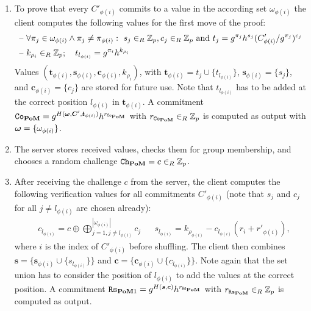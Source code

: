 \begin{enumerate}
  \item %
    To prove that every $C'_{\phi(i)}$ commits to a value in the according set $\omega_{\phi(i)}$ the client computes the following values for the first move of the proof:
    \begin{align*}
    \text{--}~ & \forall \pi_j\in\omega_{\phi(i)} \wedge \pi_j\not=\pi_{\phi(i)} :~ s_j\in_R\mathbb{Z}_p, c_j\in_R\mathbb{Z}_p \text{ and } t_j=g^{\pi_j}h^{s_j}(C'_{\phi(i)}/g^{\pi_j})^{c_j} \\      
    \text{--}~ & k_{\rho_i}\in_R\mathbb{Z}_p;\quad t_{l_{\phi(i)}}=g^{\pi_i}h^{k_{\rho_i}}
    \end{align*}
    Values $(\bm t_{\phi(i)}, \bm s_{\phi(i)}, \bm c_{\phi(i)}, k_{\rho_i})$, with $\bm t_{\phi(i)}=t_j \cup \{t_{l_{\phi(i)}}\}$, $\bm s_{\phi(i)}=\{s_j\}$, and $\bm c_{\phi(i)}=\{c_j\}$ are stored for future use.
    Note that $t_{l_{\phi(i)}}$ has to be added at the correct position $l_{\phi(i)}$ in $\bm t_{\phi(i)}$.
    A commitment $\mathtt{Co}_{\mathsf{\bf PoM}}=g^{H(\boldsymbol{\mathbf{\omega}}, \bm C', \bm t_{\phi(i)})} h^{r_{\mathtt{Co}_\mathsf{\bf PoM}}}$ with $r_{\mathtt{Co}_\mathsf{\bf PoM}}\in_R\mathbb{Z}_p$ is computed as output with $\boldsymbol{\mathbf{\omega}}=\{\omega_{\phi(i)}\}$.

  \item %
    The server stores received values, checks them for group membership, and chooses a random challenge $\mathtt{Ch}_\mathsf{\bf PoM}=c\in_R\mathbb{Z}_p$.

  \item %
    After receiving the challenge $c$ from the server, the client computes the following verification values for all commitments $C'_{\phi(i)}$ (note that $s_j$ and $c_j$ for all $j\not= l_{\phi(i)}$ are chosen already):
    \begin{align*}      
     & c_{l_{\phi(i)}}=c\oplus \bigoplus_{j=1,j\not=l_{\phi(i)}}^{|\omega_{\phi(i)}|} c_j
     && s_{l_{\phi(i)}}=k_{\rho_{\phi(i)}} - c_{l_{\phi(i)}}(r_{i}+r'_{\phi(i)}),
    \end{align*}
    where $i$ is the index of $C'_{\phi(i)}$ before shuffling.
    The client then combines $\bm s = \{\bm s_{\phi(i)} \cup \{s_{l_{\phi(i)}}\}\}$ and $\bm c = \{\bm c_{\phi(i)} \cup \{c_{l_{\phi(i)}}\}\}$.
    Note again that the set union has to consider the position of $l_{\phi(i)}$ to add the values at the correct position.
    A commitment $\mathtt{Rs}_{\mathsf{\bf PoM}1}=g^{H(\bm s, \bm c)} h^{r_{\mathtt{Rs}_\mathsf{\bf PoM}}}$ with $r_{\mathtt{Rs}_\mathsf{\bf PoM}}\in_R\mathbb{Z}_p$ is computed as output.


\end{enumerate}
